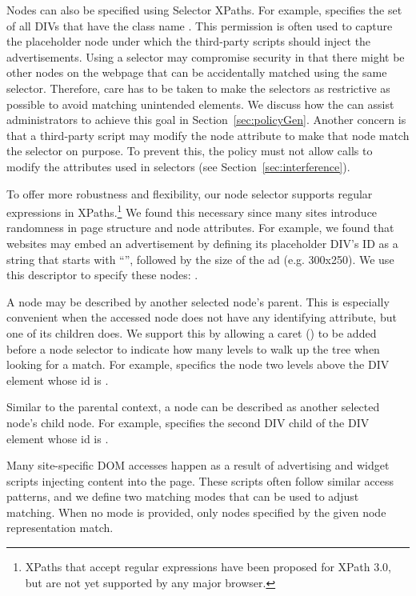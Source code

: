  Nodes can also be specified
using Selector XPaths.  For example, 
specifies the set of all DIVs that have the class name .  This
permission is often used to capture the placeholder node under which the
third-party scripts should inject the advertisements.  Using a selector
may compromise security in that there might be other nodes on the
webpage that can be accidentally matched using the same selector.
Therefore, care has to be taken to make the selectors as restrictive as
possible to avoid matching unintended elements.  We discuss how the \pg
can assist administrators to achieve this goal in
Section~\ref{sec:policyGen}.  Another concern is that a third-party
script may modify the node attribute to make that node match the
selector on purpose.  To prevent this, the policy must not allow calls
to modify the attributes used in selectors (see
Section~\ref{sec:interference}).

 To offer more robustness and
flexibility, our node selector supports regular expressions in
XPaths.\footnote{XPaths that accept regular expressions have been
  proposed for XPath 3.0, but are not yet supported by any major browser.}
We found this necessary since many sites introduce randomness in page structure and node attributes.  For example, we found
that websites may embed an advertisement by defining its placeholder
DIV's ID as a string that starts with ``'', followed by the size of the ad (e.g. 300x250).  We use this
descriptor to specify these nodes:
.

 A node may be described by another
selected node's parent.  This is especially convenient when the accessed
node does not have any identifying attribute, but one of its children
does.  We support this by allowing a caret (\policy{^}) to be added
before a node selector to indicate how many levels to walk up the tree
when looking for a match.  For example, 
specifics the node two levels above the DIV element whose id is
.

Similar to the parental context, a node can be described as another
selected node's child node.  For example,
 specifies the second DIV child of the
DIV element whose id is .

 Many site-specific DOM accesses happen as a
result of advertising and widget scripts injecting content into the
page.  These scripts often follow similar access patterns, and we define
two matching modes that can be used to adjust matching.  When no mode is
provided, only nodes specified by the given node representation match.


